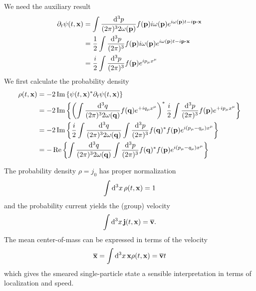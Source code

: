 We need the auxiliary result
\begin{equation}
	\begin{split}
		\partial_t\psi(t,\vb{x})
		&=
		\int\frac{\dd[3]{p}}{(2\pi)^32\omega(\vb{p})}
		f(\vb{p})i\omega(\vb{p})e^{i\omega(\vb{p})t-i\vb{p}\vdot\vb{x}}
		\\
		&=
		\frac{1}{2}
		\int\frac{\dd[3]{p}}{(2\pi)^3}
		f(\vb{p})i\omega(\vb{p})e^{i\omega(\vb{p})t-i\vb{p}\vdot\vb{x}}
		\\
		&=
		\frac{i}{2}
		\int\frac{\dd[3]{p}}{(2\pi)^3}
		f(\vb{p})
		e^{ip_\mu x^\mu}
	\end{split}
\end{equation}
We first calculate the probability density
\begin{equation}
	\begin{split}
		\rho(t,\vb{x})
		&=
		-2\operatorname{\operatorname{Im}}\left\{
			\psi(t,\vb{x})^*\partial_t\psi(t,\vb{x})		
		\right\}
		\\
		&=
		-2\operatorname{\operatorname{Im}}\left\{
			\left(
				\int\frac{\dd[3]{q}}{(2\pi)^32\omega(\vb{q})}
				f(\vb{q})
				e^{+iq_\mu x^\mu}
			\right)^*
			\frac{i}{2}
			\int\frac{\dd[3]{p}}{(2\pi)^3}
			f(\vb{p})
			e^{+ip_\mu x^\mu}
		\right\}
		\\
		&=
		-2\operatorname{\operatorname{Im}}\left\{
			\frac{i}{2}
			\int\frac{\dd[3]{q}}{(2\pi)^32\omega(\vb{q})}
			\int\frac{\dd[3]{p}}{(2\pi)^3}
			f(\vb{q})^*f(\vb{p})
			e^{i(p_\mu-q_\mu)x^\mu}
		\right\}
		\\
		&=
		-\operatorname{\operatorname{Re}}\left\{
			\int\frac{\dd[3]{q}}{(2\pi)^32\omega(\vb{q})}
			\int\frac{\dd[3]{p}}{(2\pi)^3}
			f(\vb{q})^*f(\vb{p})
			e^{i(p_\mu-q_\mu)x^\mu}
		\right\}
	\end{split}
\end{equation}

The probability density $\rho=j_0$ has proper normalization
\begin{equation}
	\int\dd[3]{x}\rho(t,\vb{x})
	=
	1
\end{equation}
and the probability current yields the (group) velocity
\begin{equation}
	\int\dd[3]{x}\vb{j}(t,\vb{x})
	=
	\overline{\vb{v}}
	\label{qkg:group_velocity}.
\end{equation}
The mean center-of-mass can be expressed in terms of the velocity
\begin{equation}
	\overline{\vb{x}}
	=
	\int\dd[3]{x}\vb{x}\rho(t,\vb{x})
	=
	\overline{\vb{v}}t
	\label{qkg:mean_position}
\end{equation}
which gives the smeared single-particle state a sensible interpretation in terms of localization and speed.

